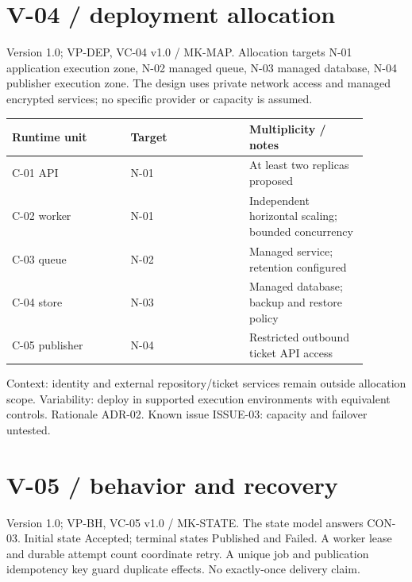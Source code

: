 \documentclass[11pt,letterpaper]{article}
\newcommand{\docsection}[1]{\Needspace{5\baselineskip}\section{#1}}
\begin{document}
\docsection{V-04 / deployment allocation}
Version 1.0; VP-DEP, VC-04 v1.0 / MK-MAP. Allocation targets N-01 application execution zone, N-02 managed queue, N-03 managed database, N-04 publisher execution zone. The design uses private network access and managed encrypted services; no specific provider or capacity is assumed.

\begin{longtable}{@{}>{\RaggedRight\arraybackslash}p{0.297\linewidth}>{\RaggedRight\arraybackslash}p{0.297\linewidth}>{\RaggedRight\arraybackslash}p{0.297\linewidth}@{}}
\toprule
\textbf{Runtime unit} & \textbf{Target} & \textbf{Multiplicity / notes}\\\midrule
\endhead
C-01 API & N-01 & At least two replicas proposed\\
C-02 worker & N-01 & Independent horizontal scaling; bounded concurrency\\
C-03 queue & N-02 & Managed service; retention configured\\
C-04 store & N-03 & Managed database; backup and restore policy\\
C-05 publisher & N-04 & Restricted outbound ticket API access\\
\bottomrule
\end{longtable}
Context: identity and external repository/ticket services remain outside allocation scope. Variability: deploy in supported execution environments with equivalent controls. Rationale ADR-02. Known issue ISSUE-03: capacity and failover untested.

\docsection{V-05 / behavior and recovery}
Version 1.0; VP-BH, VC-05 v1.0 / MK-STATE. The state model answers CON-03. Initial state Accepted; terminal states Published and Failed. A worker lease and durable attempt count coordinate retry. A unique job and publication idempotency key guard duplicate effects. No exactly-once delivery claim.
\end{document}

